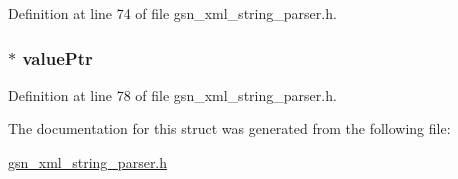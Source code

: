 Definition at line 74 of file gsn\_\-xml\_\-string\_\-parser.h.

\hypertarget{a00443_a860ec49aa5b63f34200ff0b4282fd47d}{
\subsubsection[{valuePtr}]{$\ast$ {\bf valuePtr}}}
\label{a00443_a860ec49aa5b63f34200ff0b4282fd47d}


Definition at line 78 of file gsn\_\-xml\_\-string\_\-parser.h.



The documentation for this struct was generated from the following file:\begin{DoxyCompactItemize}
\item 
\hyperlink{a00617}{gsn\_\-xml\_\-string\_\-parser.h}\end{DoxyCompactItemize}
